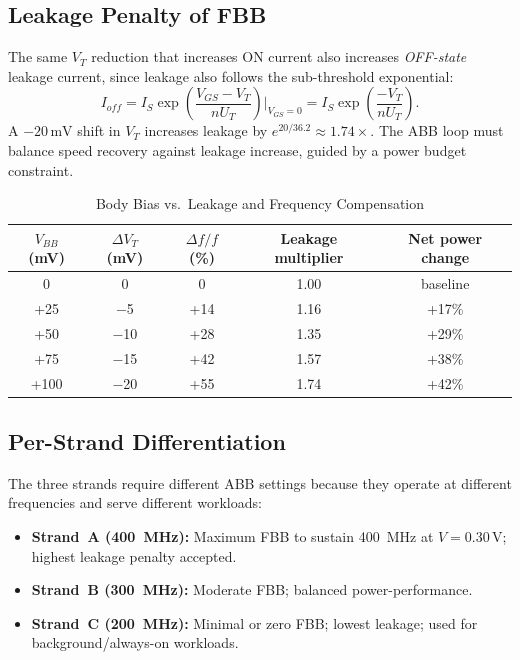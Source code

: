 \subsection{Leakage Penalty of FBB}

The same $V_T$ reduction that increases ON current also increases \emph{OFF-state} leakage
current, since leakage also follows the sub-threshold exponential:
\[
  I_{off} = I_S \exp\!\left(\frac{V_{GS} - V_T}{n U_T}\right)\bigg|_{V_{GS}=0}
           = I_S \exp\!\left(\frac{-V_T}{n U_T}\right).
\]
A $-20\,\text{mV}$ shift in $V_T$ increases leakage by $e^{20/36.2} \approx 1.74\times$.
The ABB loop must balance speed recovery against leakage increase, guided by a power budget
constraint.

\begin{table}[htbp]
\centering
\caption{Body Bias vs.\ Leakage and Frequency Compensation}
\label{tab:body_bias}
\begin{tabular}{ccccc}
\hline
$V_{BB}$ (mV) & $\Delta V_T$ (mV) & $\Delta f / f$ (\%) & Leakage multiplier & Net power change \\
\hline
0   & 0   & 0    & 1.00 & baseline \\
+25 & $-$5  & +14  & 1.16 & +17\% \\
+50 & $-$10 & +28  & 1.35 & +29\% \\
+75 & $-$15 & +42  & 1.57 & +38\% \\
+100& $-$20 & +55  & 1.74 & +42\% \\
\hline
\end{tabular}
\end{table}

\subsection{Per-Strand Differentiation}

The three strands require different ABB settings because they operate at different frequencies
and serve different workloads:
\begin{itemize}
  \item \textbf{Strand~A (400~MHz):} Maximum FBB to sustain 400~MHz at $V = 0.30\,\text{V}$;
        highest leakage penalty accepted.
  \item \textbf{Strand~B (300~MHz):} Moderate FBB; balanced power-performance.
  \item \textbf{Strand~C (200~MHz):} Minimal or zero FBB; lowest leakage; used for
        background/always-on workloads.
\end{itemize}

